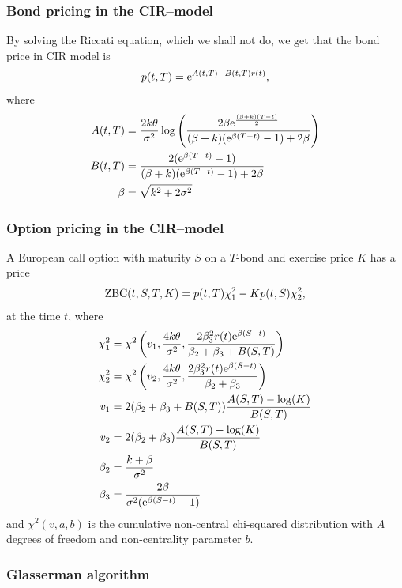 \subsubsection{Bond pricing in the CIR--model}

By solving the Riccati equation, which we shall not do, we get that the bond price in CIR model is
	\begin{align}
		p(t,T) = \mathrm{e}^{A(t,T) - B(t,T)r(t)} ,
	\end{align}
where
	\begin{align}
		A(t,T) &= \frac{2k\theta}{\sigma^2} \log \left( \frac{2 \beta \mathrm{e}^{ \frac{(\beta + k)(T-t)}{2} } }{(\beta + k)(\mathrm{e}^{\beta(T-t)} - 1) + 2\beta}  \right) \\
		B(t,T) &= \frac{ 2(\mathrm{e}^{\beta(T-t)} - 1) }{ (\beta + k)(\mathrm{e}^{\beta(T-t)} - 1) + 2\beta } \\
		\beta &= \sqrt{k^2+ 2\sigma^2}		
	\end{align}

\subsubsection{Option pricing in the CIR--model}

A European call option with maturity $S$ on a $T$-bond and exercise price $K$ has a price
\begin{align}
\operatorname{\mathrm{ZBC}}(t, S, T, K) = p(t,T) \chi_1^2 - K p(t,S) \chi_2^2,
\end{align}
at the time $t$, where
\begin{align}
	\chi_1^2 &= \chi^2 \left( v_1, \frac{4k\theta}{\sigma^2}, \frac{2\beta_3^2 r(t) \mathrm{e}^{\beta (S-t)} }{\beta_2 + \beta_3 + B(S,T)} \right) \\
	\chi_2^2 &= \chi^2 \left( v_2, \frac{4k\theta}{\sigma^2}, \frac{2\beta_3^2 r(t) \mathrm{e}^{\beta (S-t)} }{\beta_2 + \beta_3} \right) \\
	v_1 &= 2( \beta_2 + \beta_3 + B(S,T) ) \frac{A(S,T)-\log(K)}{B(S,T)} \\
	v_2 &= 2( \beta_2 + \beta_3 ) \frac{A(S,T)-\log(K)}{B(S,T)} \\
	\beta_2 &= \frac{k+\beta}{\sigma^2}\\
	\beta_3 &= \frac{2\beta}{\sigma^2 (\mathrm{e}^{\beta(S-t)} - 1) }
\end{align}
and $\chi^2(v,a,b)$ is the cumulative non-central chi-squared distribution with $A$ degrees of freedom and non-centrality parameter $b$.

\iffalse

\subsubsection{Glasserman algorithm}

